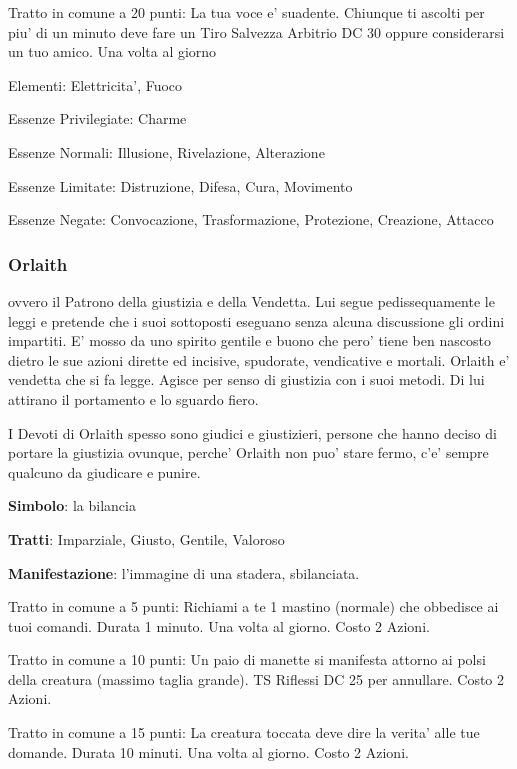 \documentclass[a4paper,11pt,twoside,openany]{dndbook}
\begin{document}
{Tratto in comune a 20 punti: La tua voce e' suadente. Chiunque ti ascolti per piu' di un minuto deve fare un Tiro Salvezza Arbitrio DC 30 oppure considerarsi un tuo amico. Una volta al giorno

\bigskip

Elementi: Elettricita', Fuoco

\bigskip

Essenze Privilegiate: Charme

Essenze Normali: Illusione, Rivelazione, Alterazione

Essenze Limitate: Distruzione, Difesa, Cura, Movimento

Essenze Negate: Convocazione, Trasformazione, Protezione, Creazione, Attacco

\subsubsection{Orlaith}

\label{orlaith}

ovvero il Patrono della giustizia e della Vendetta. Lui segue pedissequamente le leggi e pretende che i suoi sottoposti eseguano senza alcuna discussione gli ordini impartiti. E' mosso da uno spirito gentile e buono che pero' tiene ben nascosto dietro le sue azioni dirette ed incisive, spudorate, vendicative e mortali. Orlaith e' vendetta che si fa legge. Agisce per senso di giustizia con i suoi metodi. Di lui attirano il portamento e lo sguardo fiero.

I Devoti di Orlaith spesso sono giudici e giustizieri, persone che hanno deciso di portare la giustizia ovunque, perche' Orlaith non puo' stare fermo, c'e' sempre qualcuno da giudicare e punire.

\textbf{Simbolo}: la bilancia

\textbf{Tratti}: Imparziale, Giusto, Gentile, Valoroso

\textbf{Manifestazione}: l'immagine di una stadera, sbilanciata.

\bigskip

Tratto in comune a 5 punti: Richiami a te 1 mastino (normale) che obbedisce ai tuoi comandi. Durata 1 minuto. Una volta al giorno. Costo 2 Azioni.

Tratto in comune a 10 punti: Un paio di manette si manifesta attorno ai polsi della creatura (massimo taglia grande). TS Riflessi DC 25 per annullare. Costo 2 Azioni.

Tratto in comune a 15 punti: La creatura toccata deve dire la verita' alle tue domande. Durata 10 minuti. Una volta al giorno. Costo 2 Azioni.

}
\end{document}
